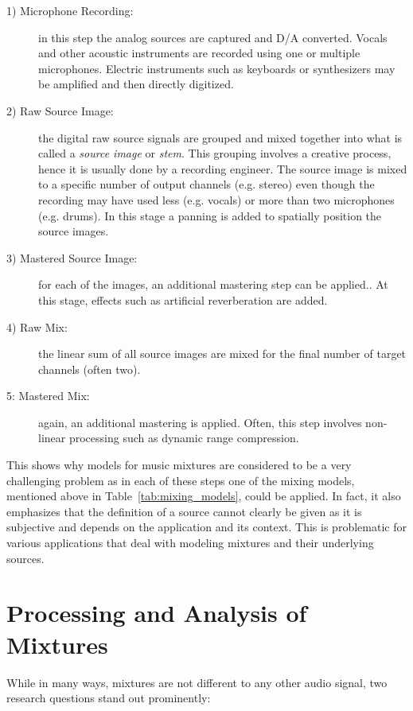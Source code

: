 \begin{description}
  \item[1) Microphone Recording:] in this step the analog sources are captured and D/A converted. 
  Vocals and other acoustic instruments are recorded using one or multiple microphones.
  Electric instruments such as keyboards or synthesizers may be amplified and then directly digitized.
  \item[2) Raw Source Image:] the digital raw source signals are grouped and mixed together into what is called a \emph{source image} or \emph{stem}.
  This grouping involves a creative process, hence it is usually done by a recording engineer.
  The source image is mixed to a specific number of output channels (e.g. stereo) even though the recording may have used less (e.g. vocals) or more than two microphones (e.g. drums).
  In this stage a panning is added to spatially position the source images.
  \item[3) Mastered Source Image:] for each of the images, an additional mastering step can be applied..
  At this stage, effects such as artificial reverberation are added.
  \item[4) Raw Mix:] the linear sum of all source images are mixed for the final number of target channels (often two).
  \item[5: Mastered Mix:] again, an additional mastering is applied.
  Often, this step involves non-linear processing such as dynamic range compression.
\end{description}

This shows why models for music mixtures are considered to be a very challenging problem as in each of these steps one of the mixing models, mentioned above in Table~\ref{tab:mixing_models}, could be applied.
In fact, it also emphasizes that the definition of a source cannot clearly be given as it is subjective and depends on the application and its context.
This is problematic for various applications that deal with modeling mixtures and their underlying sources.

\hypertarget{processing-and-analysis-of-mixtures}{%
\section{Processing and Analysis of Mixtures}\label{sec:processing-and-analysis-of-mixtures}}

While in many ways, mixtures are not different to any other audio signal, two research questions stand out prominently:


